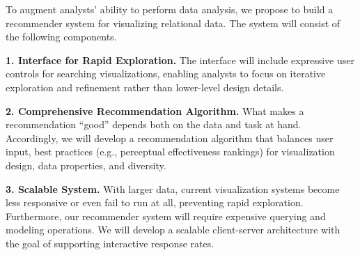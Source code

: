 To augment analysts’ ability to perform data analysis, we propose to build a recommender system for visualizing relational data. The system will consist of the following components.

\textbf{1. Interface for Rapid Exploration.}
The interface will include expressive user controls for searching visualizations, enabling analysts to focus on iterative exploration and refinement rather than lower-level design details.

\textbf{2. Comprehensive Recommendation Algorithm.}  What makes a recommendation “good” depends both on the data and task at hand.
Accordingly, we will develop a recommendation algorithm that balances user input, best practices (e.g., perceptual effectiveness rankings) for visualization design, data properties, and diversity.

\textbf{3. Scalable System.} With larger data, current visualization systems become less responsive or even fail to run at all, preventing rapid exploration.  Furthermore, our recommender system will require expensive querying and modeling operations. We will develop a scalable client-server architecture with the goal of supporting interactive response rates.

